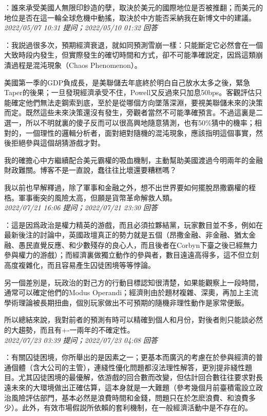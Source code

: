 \documentclass[twocolumn]{ctexart}
\begin{document}
：誰來承受美國人無限印鈔造的孽，取決於美元的國際地位是否被推翻；而美元的地位是否在這一輪全球危機中動搖，取決於中方能否采納我在新博文中的建議。
\\

\textit{\hfill\noindent\small 2022/05/07 10:31 提问；2022/05/10 01:32 回答}

：我説過很多次，預期經濟衰退，就如同預測雪崩一樣：只能斷定它必然會在一個大致時段内發生，但實際發生的確切時間和方式，卻不可能準確説定，因爲這類崩潰過程是混沌現象（Chaos Phenomenon）。

美國第一季的GDP負成長，是美聯儲去年底終於明白自己放水太多之後，緊急Taper的後果；一旦發現經濟承受不住，Powell又反過來只加息50bps。客觀評估只能確定他們無法走鋼索到底，至於是從哪個方向墜落深淵，要視美聯儲未來的決策而定。既然這些未來決策還沒有發生，旁觀者當然不可能準確預言。不過這裏是二選一，所以不明就裏的傻子反而可以很高興地隨意猜測，也有50\%猜中的機率；相對的，一個理性的邏輯分析者，面對絕對隨機的混沌現象，應該指明這個事實，然後拒絕參與這個胡猜游戲才對。

我的確擔心中方繼續配合美元霸權的吸血機制，主動幫助美國渡過今明兩年的金融財政難關。博客不是一直說，蠢往往比壞還要糟糕嗎？

我以前也早解釋過，除了軍事和金融之外，想不出世界要如何擺脫昂撒霸權的桎梏。軍事衝突的風險太高，但願是貨幣革命解救人類。
\\

\textit{\hfill\noindent\small 2022/07/21 16:06 提问；2022/07/21 23:30 回答}

：這是因爲政治是權力精英的游戲，而且必須拉夥結黨，玩家數目並不多，例如在最新後注的討論中，英國政壇真正的勢力就是五個（昂撒金融、非金融、猶太金融、愚民直覺反應、和少數殘存的良心人，而且後者在Corbyn下臺之後已經無力參與權力的游戲）；而經濟裏做獨立動作的參與者，數目遠遠高得多，這不但立刻高度複雜化，而且容易產生囚徒困境等等悖論。

另一個差別是，玩政治的對己方的行動目標認知很清楚，如果能觀察上一段時間，通常可以確定他們的Modus Operandi；經濟則由於題材複雜、深奧，再加上主流學術理論被長期扭曲，個別玩家做出不可預期的隨機非理性動作是家常便飯。

所以總結來說，我對前者的預測有時可以精確到個人和月份，對後者則只能談必然的大趨勢，而且有+-一兩年的不確定性。
\\

\textit{\hfill\noindent\small 2022/07/23 03:39 提问；2022/07/23 04:08 回答}

：有關囚徒困境，你所舉出的是因素之一；更基本而廣汎的考慮在於參與經濟的普通個體（含大公司的主管），連綫性優化問題都沒法理性解答，更別提非綫性題目。尤其囚徒困境的最優解，依游戲的回合數而改變，但估計回合數往往要求對長遠未來的大環境做出正確估算，這本身就是一大難題（參考幾個月前臺積電設立政治風險評估部門，基本必然是浪費時間和金錢，問題只在於怎麽浪費、和浪費多少）。此外，有效市場假説所依賴的套利機制，在一般經濟活動中是不存在的。
\end{document}
